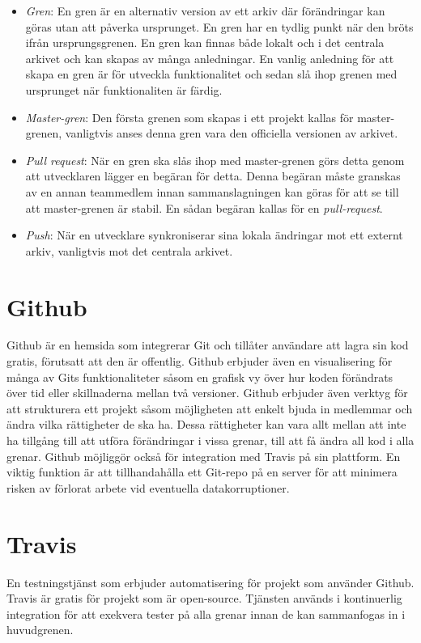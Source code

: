 \begin{itemize}
	\item \textit{Gren}: En gren är en alternativ version av ett arkiv där förändringar kan göras utan att påverka ursprunget. En gren har en tydlig punkt när den bröts ifrån ursprungsgrenen. En gren kan finnas både lokalt och i det centrala arkivet och kan skapas av många anledningar. En vanlig anledning för att skapa en gren är för utveckla funktionalitet och sedan slå ihop grenen med ursprunget när funktionaliten är färdig.

	\item\textit{Master-gren}: Den första grenen som skapas i ett projekt kallas för master-grenen, vanligtvis anses denna gren vara den officiella versionen av arkivet.

	\item \textit{Pull request}: När en gren ska slås ihop med master-grenen görs detta genom att utvecklaren lägger en begäran för detta. Denna begäran måste granskas av en annan teammedlem innan sammanslagningen kan göras för att se till att master-grenen är stabil. En sådan begäran kallas för en \textit{pull-request}.

	\item \textit{Push}: När en utvecklare synkroniserar sina lokala ändringar mot ett externt arkiv, vanligtvis mot det centrala arkivet.
\end{itemize}


\section{Github}
Github är en hemsida som integrerar Git och tillåter användare att lagra sin kod gratis, förutsatt att den är offentlig. Github erbjuder även en visualisering för många av Gits funktionaliteter såsom en grafisk vy över hur koden förändrats över tid eller skillnaderna mellan två versioner. Github erbjuder även verktyg för att strukturera ett projekt såsom möjligheten att enkelt bjuda in medlemmar och ändra vilka rättigheter de ska ha. Dessa rättigheter kan vara allt mellan att inte ha tillgång till att utföra förändringar i vissa grenar, till att få ändra all kod i alla grenar. Github möjliggör också för integration med Travis på sin plattform. En viktig funktion är att tillhandahålla ett Git-repo på en server för att minimera risken av förlorat arbete vid eventuella datakorruptioner.~\cite{Github}

\section{Travis}
En testningstjänst som erbjuder automatisering för projekt som använder Github. Travis är gratis för projekt som är open-source. Tjänsten används i kontinuerlig integration för att exekvera tester på alla grenar innan de kan sammanfogas in i huvudgrenen.~\cite{Travis}

